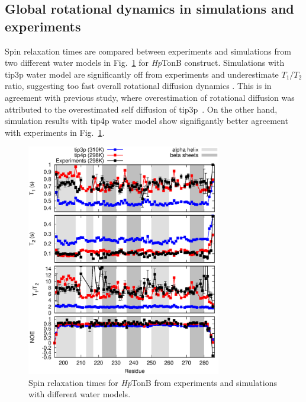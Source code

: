 \documentclass[pre,aps,floatfix,authordate1-4,twocolumn]{revtex4-1}
\begin{document}
\subsection{Global rotational dynamics in simulations and experiments}

Spin relaxation times are compared between experiments and simulations from two
different water models in Fig.~\ref{HpTonBrelaxationDATA} for {\it Hp}TonB construct.
Simulations with tip3p water model are significantly
off from experiments and underestimate $T_1/T_2$ ratio, suggesting too
fast overall rotational diffusion dynamics \cite{carper97}.
This is in agreement with previous study, where overestimation of
rotational diffusion was attributed to the overestimated self diffusion of tip3p~\cite{wong08}.
On the other hand, simulation results with tip4p water model show signifigantly
better agreement with experiments in  Fig.~\ref{HpTonBrelaxationDATA}.
\begin{figure}[!h]
  \includegraphics[width=8.5cm]{../Figs/HpTonBrelaxationDATA.eps}%
  \caption{Spin relaxation times for {\it Hp}TonB from experiments \cite{??}
    and simulations with different water models.
    \label{HpTonBrelaxationDATA}}%
\end{figure}
\end{document}
